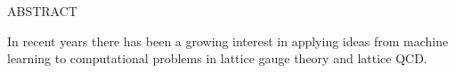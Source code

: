 \begin{doublespace}
\begin{tightcenter}
ABSTRACT
\mylinespacing%
\end{tightcenter}


%
In recent years there has been a growing interest in applying ideas from machine learning to computational problems in
lattice gauge theory and lattice QCD.
%


%
%

%


\end{doublespace}
